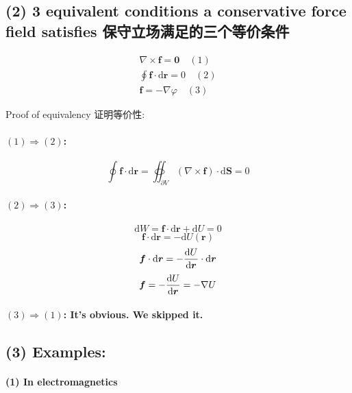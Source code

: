 \subsection*{(2) 3 equivalent conditions a conservative force field satisfies 保守立场满足的三个等价条件}\label{equivalent-conditions-a-conservative-force-field-satisfies-ux4fddux5b88ux7acbux573aux6ee1ux8db3ux7684ux4e09ux4e2aux7b49ux4ef7ux6761ux4ef6}

\begin{align*}
    \nabla \times \boldsymbol f = \boldsymbol 0 \quad(1) \\
    \oint \boldsymbol f \cdot \mathrm d \boldsymbol r = 0 \quad(2) \\
    \boldsymbol f = - \nabla \varphi \quad(3)
\end{align*}

Proof of equivalency 证明等价性:

\paragraph{\((1) \Rightarrow (2)\):}\label{rightarrow-2}

\[\oint \boldsymbol f \cdot \mathrm d \boldsymbol r = \oiint_{\partial V} (\nabla \times \boldsymbol f) \cdot \mathrm d \boldsymbol S = 0\]

\paragraph{\((2) \Rightarrow (3)\):}\label{rightarrow-3}

\[\mathrm dW = \boldsymbol f \cdot \mathrm d \boldsymbol r + \mathrm dU = 0\] \[\boldsymbol f \cdot \mathrm d \boldsymbol r = - \mathrm dU(\boldsymbol r) \] \[\boldsymbol f \cdot \mathrm d \boldsymbol r = - {\mathrm dU \over \mathrm d \boldsymbol r } \cdot \mathrm d \boldsymbol r \] \[\boldsymbol f = - {\mathrm dU \over \mathrm d \boldsymbol r } = - \nabla U \]

\paragraph{\((3) \Rightarrow (1)\): It's obvious. We skipped it.}\label{rightarrow-1-its-obvious.-we-skipped-it.}

\subsection*{(3) Examples:}\label{examples}

\paragraph{(1) In electromagnetics}\label{in-electromagnetics}

